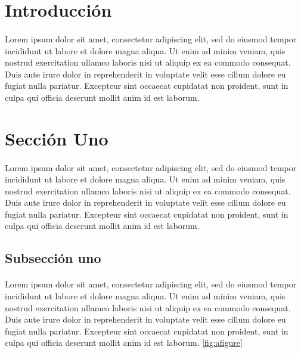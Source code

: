
\chap{\CapUno}

\section{Introducción}
\sf \paragraph{}Lorem ipsum dolor sit amet, consectetur adipiscing elit, sed do eiusmod tempor incididunt ut labore et dolore magna aliqua. Ut enim ad minim veniam, quis nostrud exercitation ullamco laboris nisi ut aliquip ex ea commodo consequat. Duis aute irure dolor in reprehenderit in voluptate velit esse cillum dolore eu fugiat nulla pariatur. Excepteur sint occaecat cupidatat non proident, sunt in culpa qui officia deserunt mollit anim id est laborum.

\section{Sección Uno}
\paragraph{}Lorem ipsum dolor sit amet, consectetur adipiscing elit, sed do eiusmod tempor incididunt ut labore et dolore magna aliqua. Ut enim ad minim veniam, quis nostrud exercitation ullamco laboris nisi ut aliquip ex ea commodo consequat. Duis aute irure dolor in reprehenderit in voluptate velit esse cillum dolore eu fugiat nulla pariatur. Excepteur sint occaecat cupidatat non proident, sunt in culpa qui officia deserunt mollit anim id est laborum.

\subsection{Subsección uno}
\paragraph{}Lorem ipsum dolor sit amet, consectetur adipiscing elit, sed do eiusmod tempor incididunt ut labore et dolore magna aliqua. Ut enim ad minim veniam, quis nostrud exercitation ullamco laboris nisi ut aliquip ex ea commodo consequat. Duis aute irure dolor in reprehenderit in voluptate velit esse cillum dolore eu fugiat nulla pariatur. Excepteur sint occaecat cupidatat non proident, sunt in culpa qui officia deserunt mollit anim id est laborum. \ref{fig:afigure}

